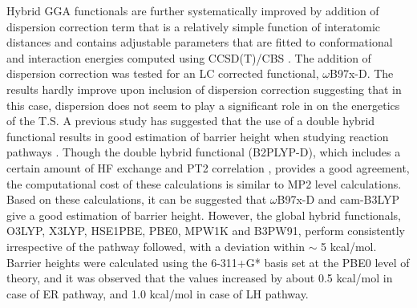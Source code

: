 Hybrid GGA functionals are further systematically improved by addition of dispersion correction term that is a relatively simple function of interatomic distances and contains adjustable parameters that are fitted to conformational and interaction energies computed using CCSD(T)/CBS \cite{grimme2006,grimme2007,grimme2011}. The addition of dispersion correction was tested for an LC corrected functional, $\omega$B97x-D. The results hardly improve upon inclusion of dispersion correction suggesting that in this case, dispersion does not seem to play a significant role in on the energetics of the T.S. A previous study has suggested that the use of a double hybrid functional results in good estimation of barrier height when studying reaction pathways \cite{svelle2009}. Though the double hybrid functional (B2PLYP-D), which includes a certain amount of HF exchange and PT2 correlation \cite{grimme2006,grimme2007}, provides a good agreement, the computational cost of these calculations is similar to MP2 level calculations. Based on these calculations, it can be suggested that $\omega$B97x-D and cam-B3LYP give a good estimation of barrier height. However, the global hybrid functionals, O3LYP, X3LYP, HSE1PBE, PBE0, MPW1K and B3PW91, perform consistently irrespective of the pathway followed, with a deviation within $\sim$ 5 kcal/mol. Barrier heights were calculated using the 6-311+G* basis set at the PBE0 level of theory, and it was observed that the values increased by about 0.5 kcal/mol in case of ER pathway, and 1.0 kcal/mol in case of LH pathway.

